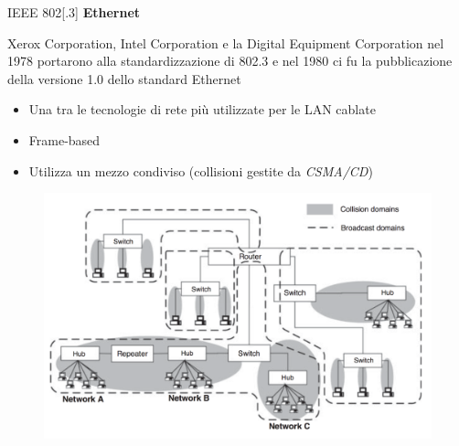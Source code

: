 \begin{frame}{IEEE 802[.3]}
	\textbf{Ethernet}
	\begin{block}{}
		Xerox Corporation, Intel Corporation e la Digital Equipment Corporation nel 1978 portarono alla standardizzazione di 802.3 e nel 1980 ci fu la pubblicazione della versione 1.0 dello standard Ethernet
	\end{block}
	\begin{itemize}
		\item Una tra le tecnologie di rete più utilizzate per le LAN cablate
		\item Frame-based
		\item Utilizza un mezzo condiviso (collisioni gestite da \textit{CSMA/CD})
	\end{itemize}
	\begin{figure}[h] 
		\includegraphics[scale=0.15,cfbox=blue_slides 1pt 0pt]{imgs/lan.png}
	\end{figure}
\end{frame}


